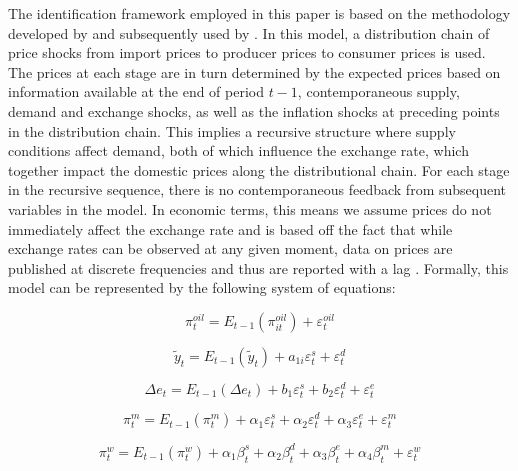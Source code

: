 \documentclass[12pt]{article}
\begin{document}
The identification framework employed in this paper is based on the methodology developed by \textcite{mccarthy1999} and subsequently used by \textcite{choudhri2015exchange}. In this model, a distribution chain of price shocks from import prices to producer prices to consumer prices is used. The prices at each stage are in turn determined by the expected prices based on information available at the end of period $t-1$, contemporaneous supply, demand  and exchange shocks, as well as the inflation shocks at preceding points in the distribution chain. This implies a recursive structure where supply conditions affect demand, both of which influence the exchange rate, which together impact the domestic prices along the distributional chain. For each stage in the recursive sequence, there is no contemporaneous feedback from subsequent variables in the model. In economic terms, this means we assume prices do not immediately affect the exchange rate and is based off the fact that while exchange rates can be observed at any given moment, data on prices are published at discrete frequencies and thus are reported with a lag \parencite{choudhri2005explaining}. Formally, this model can be represented by the following  system of equations:


\begin{equation} \label{eq:supply}
    \pi^{oil}_{t} = E_{t-1}\left(\pi^{oil}_{it}\right) + \varepsilon^{oil}_{t}
\end{equation}

\begin{equation} \label{eq:demand}
    \tilde{y}_{t} = E_{t-1}\left(\tilde{y}_{t}\right) + a_{1i}\varepsilon^{s}_{t} + \varepsilon^{d}_{t}
\end{equation}

\begin{equation} \label{eq:exrate}
    \Delta e_{t} = E_{t-1}\left(\Delta e_{t}\right) + b_{1}\varepsilon^{s}_{t} + b_{2}\varepsilon^{d}_{t} + \varepsilon^{e}_{t}
\end{equation}

\begin{equation}\label{eq:importprices}
\pi_t^m = E_{t-1}(\pi_t^m) + \alpha_{1}\varepsilon_t^s + \alpha_{2}\varepsilon_t^d + \alpha_{3}\varepsilon_t^e + \varepsilon_t^m
\end{equation}

\begin{equation}\label{eq:ppi}
\pi_t^w = E_{t-1}(\pi_t^w) + \alpha_{1}\beta_t^s + \alpha_{2}\beta_t^d + \alpha_{3}\beta_t^e + \alpha_{4}\beta_t^m + \varepsilon_t^w
\end{equation}
\end{document}

